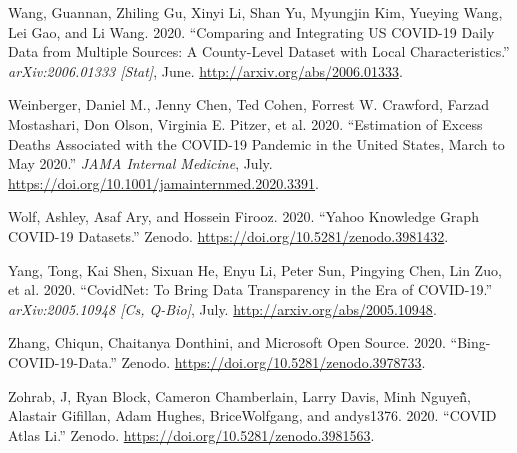 \documentclass[10pt,letterpaper]{article}
\newlength{\cslhangindent}
\newenvironment{cslreferences}%
  {\setlength{\parindent}{0pt}%
  \everypar{\setlength{\hangindent}{\cslhangindent}}\ignorespaces}%
  {\par}
\begin{document}
\begin{cslreferences}
\leavevmode\hypertarget{ref-wangComparingIntegratingUS2020}{}%
Wang, Guannan, Zhiling Gu, Xinyi Li, Shan Yu, Myungjin Kim, Yueying
Wang, Lei Gao, and Li Wang. 2020. ``Comparing and Integrating US
COVID-19 Daily Data from Multiple Sources: A County-Level Dataset with
Local Characteristics.'' \emph{arXiv:2006.01333 {[}Stat{]}}, June.
\url{http://arxiv.org/abs/2006.01333}.

\leavevmode\hypertarget{ref-weinbergerEstimationExcessDeaths2020}{}%
Weinberger, Daniel M., Jenny Chen, Ted Cohen, Forrest W. Crawford,
Farzad Mostashari, Don Olson, Virginia E. Pitzer, et al. 2020.
``Estimation of Excess Deaths Associated with the COVID-19 Pandemic in
the United States, March to May 2020.'' \emph{JAMA Internal Medicine},
July. \url{https://doi.org/10.1001/jamainternmed.2020.3391}.

\leavevmode\hypertarget{ref-ashleywolfYahooKnowledgeGraph2020}{}%
Wolf, Ashley, Asaf Ary, and Hossein Firooz. 2020. ``Yahoo Knowledge
Graph COVID-19 Datasets.'' Zenodo.
\url{https://doi.org/10.5281/zenodo.3981432}.

\leavevmode\hypertarget{ref-yangCovidNetBringData2020}{}%
Yang, Tong, Kai Shen, Sixuan He, Enyu Li, Peter Sun, Pingying Chen, Lin
Zuo, et al. 2020. ``CovidNet: To Bring Data Transparency in the Era of
COVID-19.'' \emph{arXiv:2005.10948 {[}Cs, Q-Bio{]}}, July.
\url{http://arxiv.org/abs/2005.10948}.

\leavevmode\hypertarget{ref-chiqunzhangBingCOVID19Data2020}{}%
Zhang, Chiqun, Chaitanya Donthini, and Microsoft Open Source. 2020.
``Bing-COVID-19-Data.'' Zenodo.
\url{https://doi.org/10.5281/zenodo.3978733}.

\leavevmode\hypertarget{ref-jzohrabCOVIDAtlasLi2020}{}%
Zohrab, J, Ryan Block, Cameron Chamberlain, Larry Davis, Minh Nguyeñ̂,
Alastair Gifillan, Adam Hughes, BriceWolfgang, and andys1376. 2020.
``COVID Atlas Li.'' Zenodo.
\url{https://doi.org/10.5281/zenodo.3981563}.
\end{cslreferences}

\nolinenumbers
\end{document}
